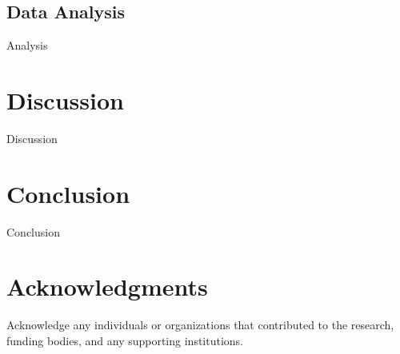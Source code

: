 \documentclass[final, 3p, 11pt]{elsarticle}
\begin{document}
\subsection{Data Analysis}
Analysis

\section{Discussion}
Discussion

\section{Conclusion}
Conclusion

\section*{Acknowledgments}
Acknowledge any individuals or organizations that contributed to the research, funding bodies, and any supporting institutions.

\newpage

\end{document}
